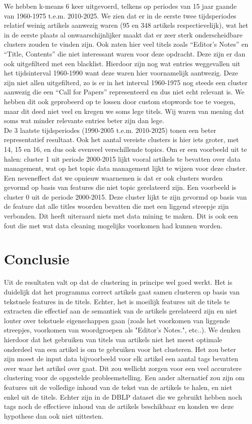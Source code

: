 \documentclass[11pt]{article}
\begin{document}
We hebben k-means 6 keer uitgevoerd, telkens op periodes van 15 jaar gaande van 1960-1975 t.e.m. 2010-2025. We zien dat er in de eerste twee tijdsperiodes relatief weinig artikels aanwezig waren (95 en 348 artikels respectievelijk), wat het in de eerste plaats al onwaarschijnlijker maakt dat er zeer sterk onderscheidbare clusters zouden te vinden zijn. Ook zaten hier veel titels zoals ``Editor's Notes'' en ``Title, Contents'' die niet interessant waren voor deze opdracht. Deze zijn er dan ook uitgefilterd met een blacklist. Hierdoor zijn nog wat entries weggevallen uit het tijdsinterval 1960-1990 want deze waren hier voornamelijk aantwezig. Deze zijn niet allen uitgefilterd, zo is er in het interval 1960-1975 nog steeds een cluster aanwezig die een ``Call for Papers'' representeerd en dus niet echt relevant is. We hebben dit ook geprobeerd op te lossen door custom stopwords toe te voegen, maar dit deed niet veel en kregen we soms lege titels. Wij waren van mening dat soms wat minder relevante entries beter zijn dan lege. \\

De 3 laatste tijdsperiodes (1990-2005 t.e.m. 2010-2025) tonen een beter representatief resultaat. Ook het aantal vereiste clusters is hier iets groter, met 14, 15 en 16, en dus ook evenveel verschillende topics. Om er een voorbeeld uit te halen: cluster 1 uit periode 2000-2015 lijkt vooral artikels te bevatten over data management, wat op het topic data management lijkt te wijzen voor deze cluster. \\
Een neveneffect dat we opnieuw waarnemen is dat er ook clusters worden gevormd op basis van features die niet topic gerelateerd zijn. Een voorbeeld is cluster 0 uit de periode 2000-2015. Deze cluster lijkt te zijn gevormd op basis van de feature dat alle titles woorden bevatten die met een liggend streepje zijn verbonden. Dit heeft uiteraard niets met data mining te maken. Dit is ook een fout die met wat data cleaning mogelijks voorkomen had kunnen worden. 

\section{Conclusie}
Uit de resultaten valt op dat de clustering in principe wel goed werkt. Het is duidelijk dat het programma correct artikels gaat samen clusteren op basis van tekstuele features in de titels. Echter, het is moeilijk features uit de titels te extracten die effectief aan de semantiek van de artikels gerelateerd zijn en niet louter over tekstuele eigenschappen gaan (zoals het voorkomen van liggende streepjes, voorkomen van woordgroepen als "Editor's Notes.", etc..). We denken hierdoor dat het gebruiken van titels van artikels niet het meest optimale onderdeel van een artikel is om te gebruiken voor het clusteren. Het zou beter zijn moest de input data bijvoorbeeld voor elk artikel een aantal tags bevatten over waar het artikel over gaat. Dit zou wellicht zorgen voor een veel accuratere clustering voor de opgestelde probleemstelling. Een ander alternatief zou zijn om features uit de volledige inhoud van de tekst van de artikels te halen, en niet enkel uit de titels. Echter zijn in de DBLP dataset die we gebruikt hebben noch tags noch de effectieve inhoud van de artikels beschikbaar en konden we deze hypothese dan ook niet uittesten. 
\end{document}
